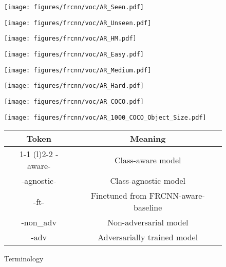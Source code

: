 \documentclass[10pt,twocolumn,letterpaper]{article}
\begin{document}
{
\def \fs {0.33} \def \sfs {1} \begin{figure*}
\centering
\begin{subfigure}{\fs\textwidth}
\centering
\texttt{[image: figures/frcnn/voc/AR\_Seen.pdf]}
\end{subfigure}
\begin{subfigure}{\fs\textwidth}
\centering
\texttt{[image: figures/frcnn/voc/AR\_Unseen.pdf]}
\end{subfigure}
\begin{subfigure}{\fs\textwidth}
\centering
\texttt{[image: figures/frcnn/voc/AR\_HM.pdf]}
\end{subfigure}
\begin{subfigure}{\fs\textwidth}
\centering
\texttt{[image: figures/frcnn/voc/AR\_Easy.pdf]}
\end{subfigure}
\begin{subfigure}{\fs\textwidth}
\centering
\texttt{[image: figures/frcnn/voc/AR\_Medium.pdf]}
\end{subfigure}
\begin{subfigure}{\fs\textwidth}
\centering
\texttt{[image: figures/frcnn/voc/AR\_Hard.pdf]}
\end{subfigure}
\begin{subfigure}{\fs\textwidth}
\centering
\texttt{[image: figures/frcnn/voc/AR\_COCO.pdf]}
\end{subfigure}
\begin{subfigure}{\fs\textwidth}
\centering
\texttt{[image: figures/frcnn/voc/AR\_1000\_COCO\_Object\_Size.pdf]}
\end{subfigure}
\begin{subfigure}{\fs\textwidth}
\scriptsize
\centering
\vspace{-20pt}
\caption*{Terminology}
\setlength{\tabcolsep}{0.5em}
\begin{tabular}{c c}
\toprule
    \textbf{Token} & \textbf{Meaning} \\
    \cmidrule(r){1-1} \cmidrule(l){2-2}
    -aware- & Class-aware model \\
    -agnostic- & Class-agnostic model \\
    -ft- & Finetuned from FRCNN-aware-baseline \\
    -non\_adv & Non-adversarial model \\
    -adv & Adversarially trained model \\

\end{tabular}
\end{subfigure}
\end{figure*}}
\end{document}

